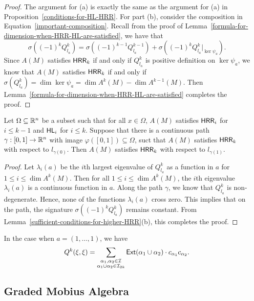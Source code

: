 \documentclass{puthesis-UG}
\begin{document}
\begin{proof}
	The argument for (a) is exactly the same as the argument for (a) in Proposition~\ref{conditions-for-HL-HRR}. For part (b), consider the composition in Equation~\ref{important-composition}. Recall from the proof of Lemma~\ref{formula-for-dimension-when-HRR-HL-are-satisfied}, we have that 
	\[
		\sigma ((-1)^k Q_{l_a}^k) = \sigma \left((-1)^{k-1} Q_{l_a}^{k-1}\right) + \sigma \left((-1)^k Q_{l_a}^k |_{\ker \psi_a}\right).
	\]
	Since $A(M)$ satisfies $\mathsf{HRR}_k$ if and only if $Q_{l_a}^k$ is positive definition on $\ker \psi_a$, we know that $A(M)$ satisfies $\mathsf{HRR}_k$ if and only if $\sigma (Q_{l_a}^k) = \dim \ker \psi_a = \dim A^k(M) - \dim A^{k-1}(M)$. Then Lemma~\ref{formula-for-dimension-when-HRR-HL-are-satisfied} completes the proof.  
\end{proof}

\begin{lem} \label{one-element-is-enough}
	Let $\Omega \subseteq \mathbb{R}^n$ be a subset such that for all $x \in \Omega$, $A(M)$ satisfies $\mathsf{HRR}_i$ for $i \leq k-1$ and $\mathsf{HL}_i$ for $i \leq k$. Suppose that there is a continuous path $\gamma : [0, 1] \to \mathbb{R}^n$ with image $\varphi ([0, 1]) \subseteq \Omega$, suct that $A(M)$ satisfies $\mathsf{HRR}_k$ with respect to $l_{\gamma(0)}$. Then $A(M)$ satisfies $\mathsf{HRR}_k$ with respect to $l_{\gamma(1)}$. 
\end{lem}

\begin{proof}
	Let $\lambda_i(a)$ be the $i$th largest eigenvalue of $Q_{l_a}^k$ as a function in $a$ for $1 \leq i \leq \dim A^k(M)$. Then for all $1 \leq i \leq \dim A^k(M)$, the $i$th eigenvalue $\lambda_i(a)$ is a continuous function in $a$. Along the path $\gamma$, we know that $Q_{l_a}^k$ is non-degenerate. Hence, none of the functions $\lambda_i(a)$ cross zero. This implies that on the path, the signature $\sigma \left((-1)^k Q_{l_a}^k\right)$ remains constant. From Lemma~\ref{sufficient-conditions-for-higher-HRR}(b), this completes the proof.
\end{proof}
In the case when $a = (1, \ldots, 1)$, we have 
\[
	Q^k(\xi, \xi) = \sum_{\substack{\alpha_1, \alpha_2 \in \mathcal{I} \\ \alpha_1 \cup \alpha_2 \in \mathcal{I}_{2k}}} \mathsf{Ext}(\alpha_1 \cup \alpha_2) \cdot c_{\alpha_1} c_{\alpha_2}.
\]
\subsection{Graded Mobius Algebra}
\end{document}
